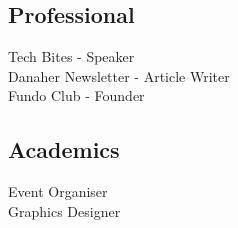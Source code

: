 \documentclass[a4paper]{deedy-resume-openfont}
\begin{document}
\begin{minipage}[t]{0.33\textwidth}
\subsection{Professional}
Tech Bites - Speaker \\
Danaher Newsletter - Article Writer \\
Fundo Club - Founder \\
\sectionsep

\subsection{Academics}
Event Organiser \\
Graphics Designer

%
%

\end{minipage} 
\hfill
\end{document}
